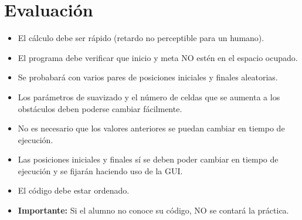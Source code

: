 \documentclass[letterpaper,12pt]{article}
\begin{document}
\section{Evaluación}
\begin{itemize}
\item El cálculo debe ser rápido (retardo no perceptible para un humano). 
\item El programa debe verificar que  inicio y meta NO estén en el espacio ocupado.
\item Se probabará con varios pares de posiciones iniciales y finales aleatorias.
\item Los parámetros de suavizado y el número de celdas que se aumenta a los obstáculos deben poderse cambiar fácilmente.
\item No es necesario que los valores anteriores se puedan cambiar en tiempo de ejecución. 
\item Las posiciones iniciales y finales sí se deben poder cambiar en tiempo de ejecución y se fijarán haciendo uso de la GUI.
\item El código debe estar ordenado.
\item \textbf{Importante: } Si el alumno no conoce su código, NO se contará la práctica.
\end{itemize}
\end{document}
